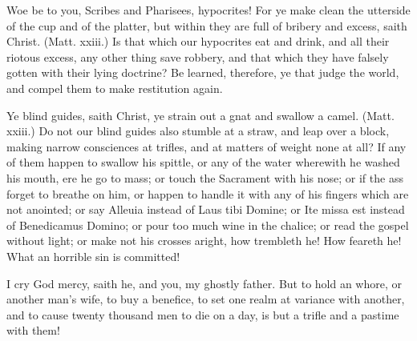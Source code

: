 Woe be to you, Scribes and Pharisees, hypocrites! 
For ye make clean the utterside of the cup and of the 
platter, but within they are full of bribery and excess, 
saith Christ. (Matt. xxiii.) Is that which our hypocrites 
eat and drink, and all their riotous excess, any other thing 
save robbery, and that which they have falsely gotten with 
their lying doctrine? Be learned, therefore, ye that judge 
the world, and compel them to make restitution again. 

Ye blind guides, saith Christ, ye strain out a gnat and 
swallow a camel. (Matt. xxiii.) Do not our blind 
guides also stumble at a straw, and leap over a block, 
making narrow consciences at trifles, and at matters of 
weight none at all? If any of them happen to swallow 
his spittle, or any of the water wherewith he washed his 
mouth, ere he go to mass; or touch the Sacrament with 
his nose; or if the ass forget to breathe on him, or happen 
to handle it with any of his fingers which are not anointed; 
or say Alleuia instead of Laus tibi Domine; or Ite 
missa est instead of Benedicamus Domino; or pour too 
much wine in the chalice; or read the gospel without 
light; or make not his crosses aright, how trembleth he! 
How feareth he! What an horrible sin is committed! 

I cry God mercy, saith he, and you, my ghostly father. 
But to hold an whore, or another man's wife, to buy a 
benefice, to set one realm at variance with another, and to 
cause twenty thousand men to die on a day, is but a 
trifle and a pastime with them! 

